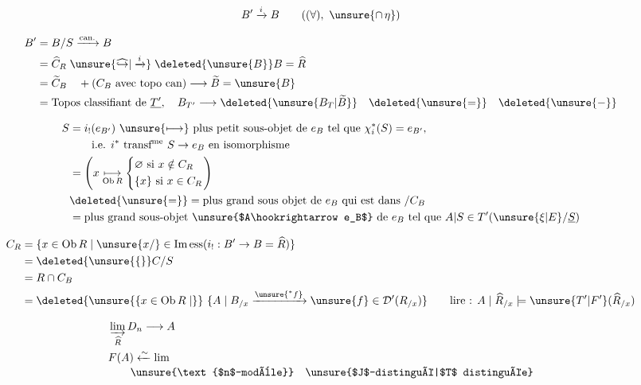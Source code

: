 \[
 B'\xrightarrow{i}B\qquad ((\forall),\ \unsure{\cap\,\eta})
\]

\[
\begin{aligned}
 B'&=B/S\xrightarrow{\mathrm{can.}}B\\
 &=\widehat C_R \mathrel{\unsure{\widehat{\hookrightarrow}|\xrightarrow{i}}} \deleted{\unsure{B}}B=\widehat R\\
 &=\widetilde C_B\quad+ (C_B\text{ avec topo can})\longrightarrow\widetilde B=\unsure{B}\\
 &=\text{Topos classifiant de }\underline{T'},\quad B_{T'}\longrightarrow
 \deleted{\unsure{B_T|\widetilde B}}\quad\deleted{\unsure{=}}\quad\deleted{\unsure{-}}
\end{aligned}
\]

\[
\begin{aligned}
 S&=i_!(e_{B'})\ \unsure{\longmapsto}\ \text{plus petit sous-objet de $e_B$ tel que }
 \chi_i^*(S)=e_{B'},\\
 &\hspace{2em}\text{i.e. $i^*$ transf\textsuperscript{me} $S\to e_B$ en isomorphisme}\\
 &=\left(x\underset{\operatorname{Ob} R}{\longmapsto}
 \left\{\begin{aligned}&\varnothing\ \text{si }x\notin C_R\\&\{x\}\ \text{si }x\in C_R\end{aligned}\right.\right)\\
 &\deleted{\unsure{=}}=\text{plus grand sous objet de $e_B$ qui est dans }/C_B\\
 &=\text{plus grand sous-objet \unsure{$A\hookrightarrow e_B$} de $e_B$ tel que }
 A|S\in T'(\unsure{\xi|E}/\underline S)
\end{aligned}
\]

\[
\begin{aligned}
 C_R&=\{x\in\operatorname{Ob} R\mid \unsure{x/} \in\operatorname{Im\,ess}(i_!:B'\to B=\widehat R)\}\\
 &=\deleted{\unsure{\{}} C/S\\
 &=R\cap C_B\\
 &=\deleted{\unsure{\{x\in\operatorname{Ob}R\mid}}\ \{A\mid B_{/x}\xrightarrow{\unsure{{}^*f}}
 \unsure{f} \in\mathcal D'(R_{/x})\}\qquad
 \text{lire : }A\mid\widehat R_{/x}\models\unsure{T'|F'}(\widehat R_{/x})
\end{aligned}
\]

\[
\begin{aligned}
 &\varinjlim_{\widehat R}D_n\longrightarrow A\\
 &F(A)\xleftarrow{\sim}\lim\\[-2pt]
 &\hspace{2em}\unsure{\text{$n$-modèle}}\quad
 \text{\unsure{$J$-distingué|$T$ distinguée}}
\end{aligned}
\]

